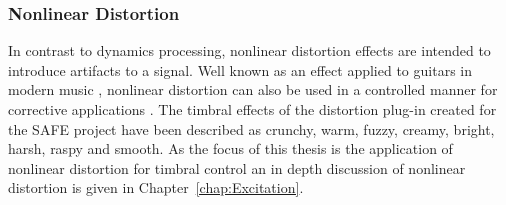 		\subsubsection*{Nonlinear Distortion}
			In contrast to dynamics processing, nonlinear distortion effects are intended to introduce
			artifacts to a signal. Well known as an effect applied to guitars in modern music
			\citep{yeh2009digital}, nonlinear distortion can also be used in a controlled manner for corrective
			applications \citep{larsen2004audio}. The timbral effects of the distortion plug-in created for the
			SAFE project have been described as crunchy, warm, fuzzy, creamy, bright, harsh, raspy and smooth.
			As the focus of this thesis is the application of nonlinear distortion for timbral control an in
			depth discussion of nonlinear distortion is given in Chapter~\ref{chap:Excitation}. 
